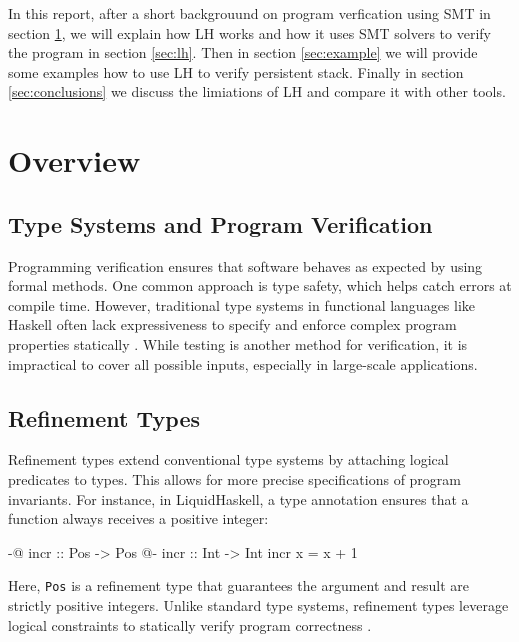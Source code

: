 \documentclass[]{rptuseminar}
\begin{document}
In this report, after a short backgrouund on program verfication using SMT in section \ref{sec:background}, we will explain 
how LH works and how it uses SMT solvers to 
verify the program in section \ref{sec:lh}. Then in section \ref{sec:example} we will provide some examples how to use 
LH to verify persistent stack. Finally in section \ref{sec:conclusions} we 
discuss the limiations of LH and compare it with other tools.


\section{Overview}
\label{sec:background}

\subsection{Type Systems and Program Verification}
Programming verification ensures that software behaves as expected by using formal methods. 
One common approach is type safety, which helps catch errors at compile time. 
However, traditional type systems in functional languages like Haskell often lack expressiveness 
to specify and enforce complex program properties statically \cite{jhala_programming_2020}. 
While testing is another method for verification, 
it is impractical to cover all possible inputs, especially in large-scale applications.

\subsection{Refinement Types}
Refinement types extend conventional type systems by attaching logical predicates to types. 
This allows for more precise specifications of program invariants. 
For instance, in LiquidHaskell, a type annotation ensures that a function always receives a positive integer:

\begin{haskell}
{-@ incr :: Pos -> Pos @-}
incr :: Int -> Int
incr x = x + 1
\end{haskell}

Here, \texttt{Pos} is a refinement type that guarantees the argument and result are strictly positive integers. 
Unlike standard type systems, refinement types leverage logical constraints to statically verify program correctness 
\cite{vazou_refinement_2014}.
\end{document}
